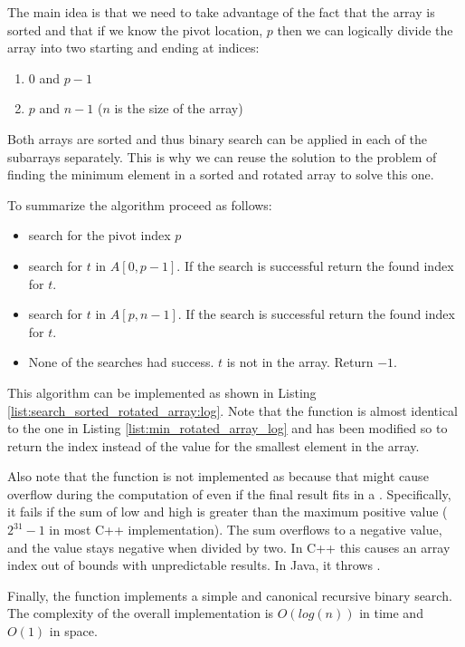 The main idea is that we need to take advantage of the fact that the array is sorted and that if we know the pivot location, $p$ then we can logically divide the array into two starting and ending at indices:
\begin{enumerate}
	\item $0$ and $p-1$
	\item $p$ and $n-1$ ($n$ is the size of the array)
\end{enumerate}
Both arrays are sorted and thus binary search can be applied in each of the subarrays separately. This is why we can reuse the solution to the problem of finding the minimum element in a sorted and rotated array to solve this one.

To summarize the algorithm proceed as follows:
\begin{itemize}
	\item search for the pivot index $p$
	\item search for $t$ in $A[0,p-1]$. If the search is successful return the found index for $t$.
	\item search for $t$ in $A[p,n-1]$.  If the search is successful return the found index for $t$.
	\item None of the searches had success. $t$ is not in the array. Return $-1$.
\end{itemize}

This algorithm can be implemented as shown in Listing \ref{list:search_sorted_rotated_array:log}. Note that the function  is almost identical to the one in Listing \ref{list:min_rotated_array_log} and has been modified so to return the index instead of the value for the smallest element in the array.

Also note that the function  is not implemented as  because that might cause overflow during the computation of  even if the final result fits in a . Specifically, it fails if the sum of low and high is greater than the maximum positive  value ($2^{31} - 1$ in most C++ implementation). The sum overflows to a negative value, and the value stays negative when divided by two. In C++ this causes an array index out of bounds with unpredictable results. In Java, it throws .

Finally, the function  implements a simple and canonical recursive binary search. 
The complexity of the overall implementation is $O(log(n))$ in time and $O(1)$ in space.



